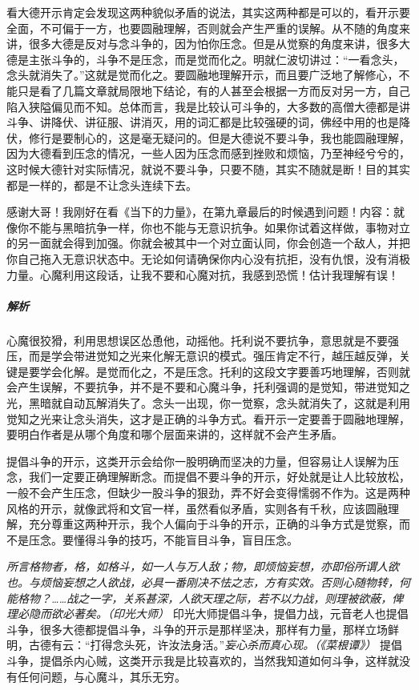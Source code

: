 看大德开示肯定会发现这两种貌似矛盾的说法，其实这两种都是可以的，看开示要全面，不可偏于一方，也要圆融理解，否则就会产生严重的误解。从不随的角度来讲，很多大德是反对与念斗争的，因为怕你压念。但是从觉察的角度来讲，很多大德是主张斗争的，斗争不是压念，而是觉而化之。明就仁波切讲过：“一看念头，念头就消失了。”这就是觉而化之。要圆融地理解开示，而且要广泛地了解修心，不能只是看了几篇文章就局限地下结论，有的人甚至会根据一方而反对另一方，自己陷入狭隘偏见而不知。总体而言，我是比较认可斗争的，大多数的高僧大德都是讲斗争、讲降伏、讲征服、讲消灭，用的词汇都是比较强硬的词，佛经中用的也是降伏，修行是要制心的，这是毫无疑问的。但是大德说不要斗争，我也能圆融理解，因为大德看到压念的情况，一些人因为压念而感到挫败和烦恼，乃至神经兮兮的，这时候大德针对实际情况，就说不要斗争，只要不随，其实不随就是断！目的其实都是一样的，都是不让念头连续下去。

\begin{case}[两种开示的圆融理解]
    感谢大哥！我刚好在看《当下的力量》，在第九章最后的时候遇到问题！内容：就像你不能与黑暗抗争一样，你也不能与无意识抗争。如果你试着这样做，事物对立的另一面就会得到加强。你就会被其中一个对立面认同，你会创造一个敌人，并把你自己拖入无意识状态中。无论如何请确保你内心没有抗拒，没有仇恨，没有消极力量。心魔利用这段话，让我不要和心魔对抗，我感到恐慌！估计我理解有误！
    \subparagraph{解析} 心魔很狡猾，利用思想误区怂恿他，动摇他。托利说不要抗争，意思就是不要强压，而是学会带进觉知之光来化解无意识的模式。强压肯定不行，越压越反弹，关键是要学会化解。是觉而化之，不是压念。托利的这段文字要善巧地理解，否则就会产生误解，不要抗争，并不是不要和心魔斗争，托利强调的是觉知，带进觉知之光，黑暗就自动瓦解消失了。念头一出现，你一觉察，念头就消失了，这就是利用觉知之光来让念头消失，这才是正确的斗争方式。看开示一定要善于圆融地理解，要明白作者是从哪个角度和哪个层面来讲的，这样就不会产生矛盾。
\end{case}

提倡斗争的开示，这类开示会给你一股明确而坚决的力量，但容易让人误解为压念，我们一定要正确理解断念。而提倡不要斗争的开示，好处就是让人比较放松，一般不会产生压念，但缺少一股斗争的狠劲，弄不好会变得懦弱不作为。这是两种风格的开示，就像武将和文官一样，虽然看似矛盾，实则各有千秋，应该圆融理解，充分尊重这两种开示，我个人偏向于斗争的开示，正确的斗争方式是觉察，而不是压念。要懂得斗争的技巧，不能盲目斗争，盲目压念。

\textit{所言格物者，格，如格斗，如一人与万人敌；物，即烦恼妄想，亦即俗所谓人欲也。与烦恼妄想之人欲战，必具一番刚决不怯之志，方有实效。否则心随物转，何能格物？……战之一字，关系甚深，人欲天理之际，若不以力战，则理被欲蔽，俾理必隐而欲必著矣。（印光大师）} 印光大师提倡斗争，提倡力战，元音老人也提倡斗争，很多大德都提倡斗争，斗争的开示是那样坚决，那样有力量，那样立场鲜明，古德有云：“打得念头死，许汝法身活。”\textit{妄心杀而真心现。（《菜根谭》）} 提倡斗争，提倡杀内心贼，这类开示我是比较喜欢的，当然我知道如何斗争，这样就没有任何问题，与心魔斗，其乐无穷。

